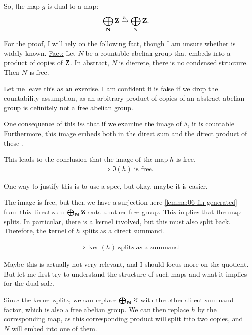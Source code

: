So, the map $g$ is dual to a map:
\begin{align*}
\bigoplus_\mathbf N \mathbf Z \xrightarrow{h} \bigoplus_\mathbf N \mathbf Z.
\end{align*}


For the proof, I will rely on the following fact, though I am unsure whether is widely known.
\underline{Fact:} Let $N$ be a countable abelian group that embeds into a product of copies of $\mathbf Z$. In abstract, $N$ is discrete, there is no condensed structure. Then $N$ is free.

Let me leave this as an exercise. I am confident it is false if we drop the countability assumption, as an arbitrary product of copies of an abstract abelian group is definitely not a free abelian group.

One consequence of this iss that if we examine the image of $h$, it is countable. Furthermore, this image embeds both in the direct sum and the direct product of these .

This leads to the conclusion that the image of the map $h$ is free.
\begin{align*}
\implies \Im(h) \text{ is free}.
\end{align*}

One way to justify this is to use a spec, but okay, maybe it is easier. 

The image is free, but then we have a surjection here \ref{lemma:06-fin-generated} from this direct sum $\bigoplus_\mathbf N \mathbf Z$ onto another free group. This implies that the map splits. In particular, there is a kernel involved, but this must also split back. Therefore, the kernel of $h$ splits as a direct summand.

\begin{align*}
\implies \ker(h) \text{ splits as a summand}
\end{align*}

Maybe this is actually not very relevant, and I should focus more on the quotient. But let me first try to understand the structure of such maps and what it implies for the dual side.

Since the kernel splits, we can replace $\bigoplus_\mathbf N Z$ with the other direct summand factor, which is also a free abelian group. We can then replace $h$ by the corresponding map, as this corresponding product will split into two copies, and $N$ will embed into one of them. 


